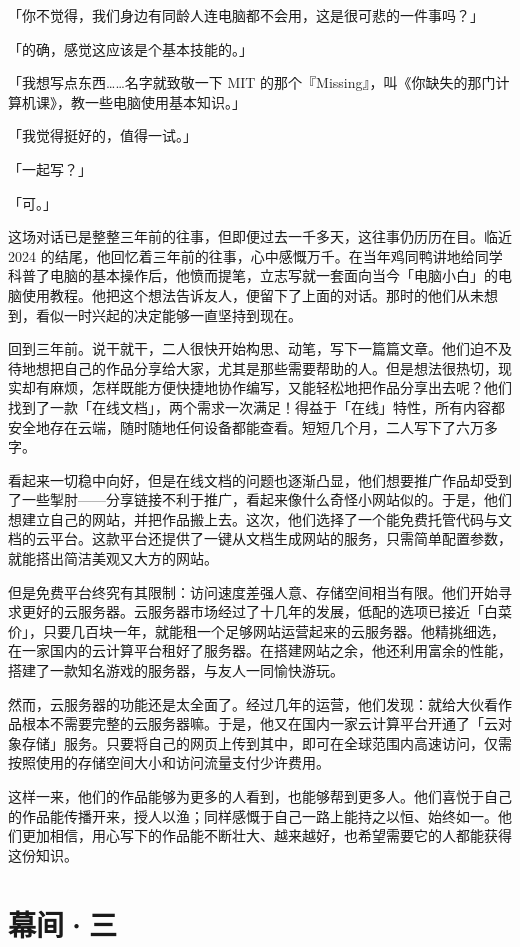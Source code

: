 「你不觉得，我们身边有同龄人连电脑都不会用，这是很可悲的一件事吗？」

「的确，感觉这应该是个基本技能的。」

「我想写点东西……名字就致敬一下 MIT 的那个『Missing』，叫《你缺失的那门计算机课》，教一些电脑使用基本知识。」

「我觉得挺好的，值得一试。」

「一起写？」

「可。」

这场对话已是整整三年前的往事，但即便过去一千多天，这往事仍历历在目。临近 2024 的结尾，他回忆着三年前的往事，心中感慨万千。在当年鸡同鸭讲地给同学科普了电脑的基本操作后，他愤而提笔，立志写就一套面向当今「电脑小白」的电脑使用教程。他把这个想法告诉友人，便留下了上面的对话。那时的他们从未想到，看似一时兴起的决定能够一直坚持到现在。

回到三年前。说干就干，二人很快开始构思、动笔，写下一篇篇文章。他们迫不及待地想把自己的作品分享给大家，尤其是那些需要帮助的人。但是想法很热切，现实却有麻烦，怎样既能方便快捷地协作编写，又能轻松地把作品分享出去呢？他们找到了一款「在线文档」，两个需求一次满足！得益于「在线」特性，所有内容都安全地存在云端，随时随地任何设备都能查看。短短几个月，二人写下了六万多字。

看起来一切稳中向好，但是在线文档的问题也逐渐凸显，他们想要推广作品却受到了一些掣肘——分享链接不利于推广，看起来像什么奇怪小网站似的。于是，他们想建立自己的网站，并把作品搬上去。这次，他们选择了一个能免费托管代码与文档的云平台。这款平台还提供了一键从文档生成网站的服务，只需简单配置参数，就能搭出简洁美观又大方的网站。

但是免费平台终究有其限制：访问速度差强人意、存储空间相当有限。他们开始寻求更好的云服务器。云服务器市场经过了十几年的发展，低配的选项已接近「白菜价」，只要几百块一年，就能租一个足够网站运营起来的云服务器。他精挑细选，在一家国内的云计算平台租好了服务器。在搭建网站之余，他还利用富余的性能，搭建了一款知名游戏的服务器，与友人一同愉快游玩。

然而，云服务器的功能还是太全面了。经过几年的运营，他们发现：就给大伙看作品根本不需要完整的云服务器嘛。于是，他又在国内一家云计算平台开通了「云对象存储」服务。只要将自己的网页上传到其中，即可在全球范围内高速访问，仅需按照使用的存储空间大小和访问流量支付少许费用。

这样一来，他们的作品能够为更多的人看到，也能够帮到更多人。他们喜悦于自己的作品能传播开来，授人以渔；同样感慨于自己一路上能持之以恒、始终如一。他们更加相信，用心写下的作品能不断壮大、越来越好，也希望需要它的人都能获得这份知识。

\section{幕间·三}

